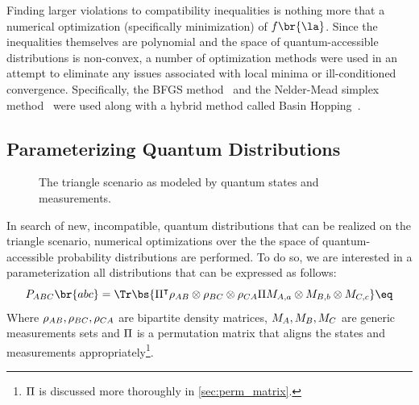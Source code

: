 \documentclass[aps, 10pt, english, twoside, pra, nofootinbib, tightenlines, longbibliography]{revtex4-1}
\begin{document}
    Finding larger violations to compatibility inequalities is nothing more that a numerical optimization (specifically minimization) of $f\br{\la}$. Since the inequalities themselves are polynomial and the space of quantum-accessible distributions is non-convex, a number of optimization methods were used in an attempt to eliminate any issues associated with local minima or ill-conditioned convergence. Specifically, the BFGS method~\cite[p. 142]{Nocedal_2000} and the Nelder-Mead simplex method~\cite[p. 238]{Nocedal_2000} were used along with a hybrid method called Basin Hopping~\cite{Wales_1997}.

    \subsection{Parameterizing Quantum Distributions}
    \label{sec:param_quantum_dist}
    \begin{figure}
    \begin{center}
            \scalebox{1.0}{}
            \caption{The triangle scenario as modeled by quantum states and measurements.}
            \label{fig:triangle_scenario_quantum_model}
    \end{center}
    \end{figure}
    In search of new, incompatible, quantum distributions that can be realized on the triangle scenario, numerical optimizations over the the space of quantum-accessible probability distributions are performed. To do so, we are interested in a parameterization all distributions that can be expressed as follows:
    \[ \prob[\p{ABC}]\br{abc} = \Tr\bs{\netperm^\intercal \rho_{\p{AB}}\otimes\rho_{\p{BC}}\otimes\rho_{\p{CA}} \netperm M_{\p{A},a}\otimes M_{\p{B},b} \otimes M_{\p{C},c}} \eq \label{eq:quantum_model_triangle}\]
    Where $\rho_{AB}, \rho_{BC}, \rho_{CA}$ are bipartite density matrices, $M_{A}, M_{B}, M_{C}$ are generic measurements sets and $\Pi$ is a permutation matrix that aligns the states and measurements appropriately\footnote{$\Pi$ is discussed more thoroughly in \cref{sec:perm_matrix}.}.
\end{document}
